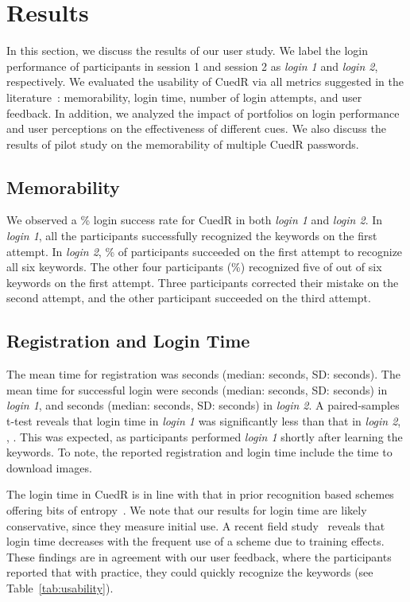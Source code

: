 \section{Results}\label{results}

In this section, we discuss the results of our user study. We label the login performance of participants in session 1 and session 2 as \textit{login 1} and \textit{login 2}, respectively. We evaluated the usability of CuedR via all metrics suggested in the literature~\cite{design_space}: memorability, login time, number of login attempts, and user feedback. In addition, we analyzed the impact of portfolios on login performance and user perceptions on the effectiveness of different cues. We also discuss the results of pilot study on the memorability of multiple CuedR passwords.

\subsection{Memorability}\label{memory}

We observed a \% login success rate for CuedR in both \textit{login 1} and \textit{login 2}. In \textit{login 1}, all the participants successfully recognized the keywords on the first attempt. In \textit{login 2}, \% of participants succeeded on the first attempt to recognize all six keywords. The other four participants (\%) recognized five of out of six keywords on the first attempt. Three participants corrected their mistake on the second attempt, and the other participant succeeded on the third attempt. 

\subsection{Registration and Login Time}\label{time} 

The mean time for registration was  seconds (median:  seconds, SD:  seconds). The mean time for successful login were  seconds (median:  seconds, SD:  seconds) in \textit{login 1}, and  seconds (median:  seconds, SD:  seconds) in \textit{login 2}. A paired-samples t-test reveals that login time in \textit{login 1} was significantly less than that in \textit{login 2}, , . This was expected, as participants performed {\em login 1} shortly after learning the keywords. To note, the reported registration and login time include the time to download images.

The login time in CuedR is in line with that in prior recognition based schemes offering  bits of entropy~\cite{image_type,text_recog}. We note that our results for login time are likely conservative, since they measure initial use. A recent field study~\cite{geopass2} reveals that login time decreases with the frequent use of a scheme due to training effects. These findings are in agreement with our user feedback, where the participants reported that with practice, they could quickly recognize the keywords (see Table~\ref{tab:usability}). 

